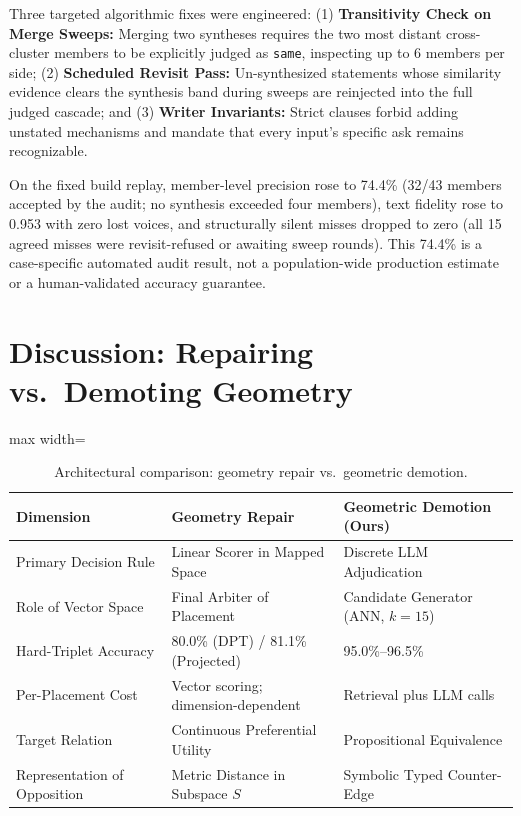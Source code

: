 \documentclass[11pt,a4paper]{article}
\begin{document}
Three targeted algorithmic fixes were engineered: (1) \textbf{Transitivity Check on Merge Sweeps:} Merging two syntheses requires the two most distant cross-cluster members to be explicitly judged as \texttt{same}, inspecting up to 6 members per side; (2) \textbf{Scheduled Revisit Pass:} Un-synthesized statements whose similarity evidence clears the synthesis band during sweeps are reinjected into the full judged cascade; and (3) \textbf{Writer Invariants:} Strict clauses forbid adding unstated mechanisms and mandate that every input's specific ask remains recognizable.

On the fixed build replay, member-level precision rose to 74.4\% (32/43 members accepted by the audit; no synthesis exceeded four members), text fidelity rose to 0.953 with zero lost voices, and structurally silent misses dropped to zero (all 15 agreed misses were revisit-refused or awaiting sweep rounds). This 74.4\% is a case-specific automated audit result, not a population-wide production estimate or a human-validated accuracy guarantee.

\section{Discussion: Repairing vs.\ Demoting Geometry}

\begin{table}[t]
\centering
\caption{Architectural comparison: geometry repair vs.\ geometric demotion.}
\label{tab:comparison}
\small
\begin{adjustbox}{max width=\textwidth}
\begin{tabular}{@{}lll@{}}
\toprule
Dimension & Geometry Repair \citep{blair2026embeddings} & Geometric Demotion (Ours) \\
\midrule
Primary Decision Rule & Linear Scorer in Mapped Space & Discrete LLM Adjudication \\
Role of Vector Space & Final Arbiter of Placement & Candidate Generator (ANN, $k=15$) \\
Hard-Triplet Accuracy & 80.0\% (DPT) / 81.1\% (Projected) & 95.0\%--96.5\% \\
Per-Placement Cost & Vector scoring; dimension-dependent & Retrieval plus LLM calls \\
Target Relation & Continuous Preferential Utility & Propositional Equivalence \\
Representation of Opposition & Metric Distance in Subspace $S$ & Symbolic Typed Counter-Edge \\
\bottomrule
\end{tabular}
\end{adjustbox}
\end{table}
\end{document}
